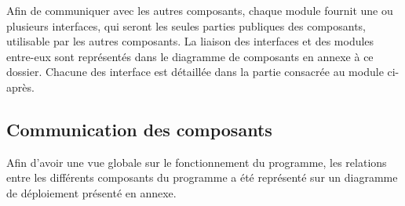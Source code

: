 Afin de communiquer avec les autres composants, chaque module fournit une ou plusieurs interfaces, qui seront les seules parties publiques des composants, utilisable par les autres composants. La liaison des interfaces et des modules entre-eux sont représentés dans le diagramme de composants en annexe à ce dossier. Chacune des interface est détaillée dans la partie consacrée au module ci-après.

\subsection{Communication des composants}

Afin d'avoir une vue globale sur le fonctionnement du programme, les relations entre les différents composants du programme a été représenté sur un diagramme de déploiement présenté en annexe.